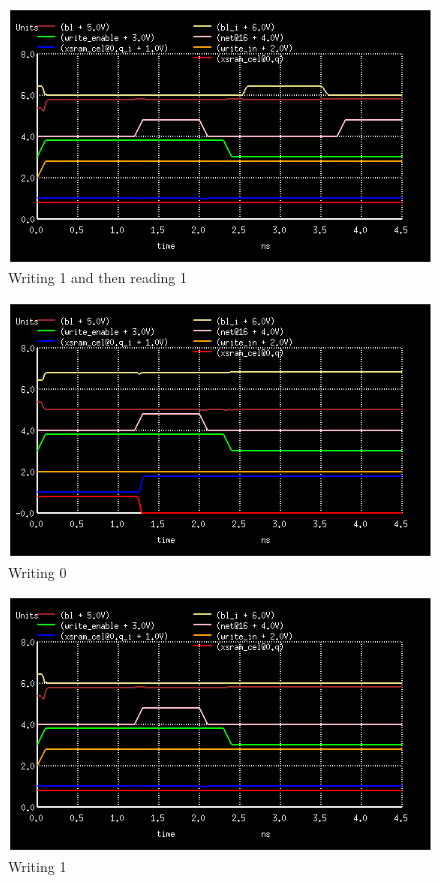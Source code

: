 \documentclass[12pt]{report}
\begin{document}
\begin{figure}[H]
  \centering
    \includegraphics[width=1.0\textwidth]{write_1_then_read_1.png}
  \caption{Writing 1 and then reading 1}
  \label{fig:write_1_then_read_1}
\end{figure}

\begin{figure}[H]
  \centering
    \includegraphics[width=1.0\textwidth]{write_1_then_write_0.png}
  \caption{Writing 0}
  \label{fig:write_1_then_write_0}
\end{figure}

\begin{figure}[H]
  \centering
    \includegraphics[width=1.0\textwidth]{write_1_then_write_1.png}
  \caption{Writing 1}
  \label{fig:write_1_then_write_1}
\end{figure}
\end{document}
